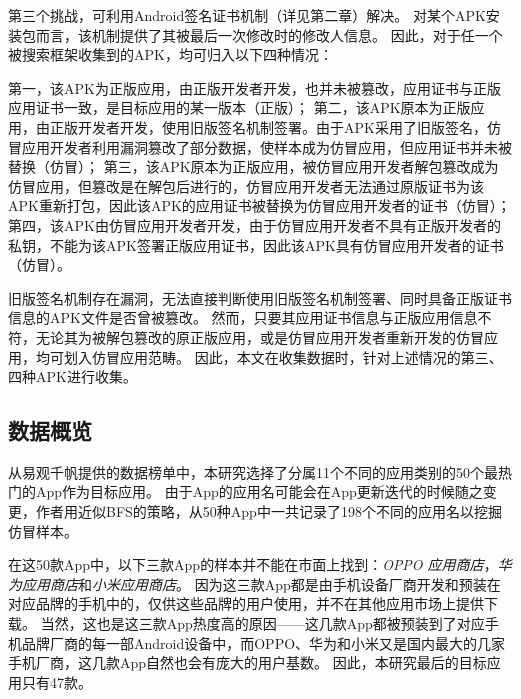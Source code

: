 第三个挑战，可利用Android签名证书机制（详见第二章）解决。
对某个APK安装包而言，该机制提供了其被最后一次修改时的修改人信息。
因此，对于任一个被搜索框架收集到的APK，均可归入以下四种情况：

第一，该APK为正版应用，由正版开发者开发，也并未被篡改，应用证书与正版应用证书一致，是目标应用的某一版本（正版）；
第二，该APK原本为正版应用，由正版开发者开发，使用旧版签名机制签署。由于APK采用了旧版签名，仿冒应用开发者利用漏洞篡改了部分数据，使样本成为仿冒应用，但应用证书并未被替换（仿冒）；
第三，该APK原本为正版应用，被仿冒应用开发者解包篡改成为仿冒应用，但篡改是在解包后进行的，仿冒应用开发者无法通过原版证书为该APK重新打包，因此该APK的应用证书被替换为仿冒应用开发者的证书（仿冒）；
第四，该APK由仿冒应用开发者开发，由于仿冒应用开发者不具有正版开发者的私钥，不能为该APK签署正版应用证书，因此该APK具有仿冒应用开发者的证书（仿冒）。

旧版签名机制存在漏洞，无法直接判断使用旧版签名机制签署、同时具备正版证书信息的APK文件是否曾被篡改。
然而，只要其应用证书信息与正版应用信息不符，无论其为被解包篡改的原正版应用，或是仿冒应用开发者重新开发的仿冒应用，均可划入仿冒应用范畴。
因此，本文在收集数据时，针对上述情况的第三、四种APK进行收集。


\subsection{数据概览}
\label{sec:data_overview}


从易观千帆提供的数据榜单中，本研究选择了分属11个不同的应用类别的50个最热门的App作为目标应用。
由于App的应用名可能会在App更新迭代的时候随之变更，作者用近似BFS的策略，从50种App中一共记录了198个不同的应用名以挖掘仿冒样本。

在这50款App中，以下三款App的样本并不能在市面上找到：\emph{OPPO 应用商店}，\emph{华为应用商店}和\emph{小米应用商店}。
因为这三款App都是由手机设备厂商开发和预装在对应品牌的手机中的，仅供这些品牌的用户使用，并不在其他应用市场上提供下载。
当然，这也是这三款App热度高的原因——这几款App都被预装到了对应手机品牌厂商的每一部Android设备中，而OPPO、华为和小米又是国内最大的几家手机厂商，这几款App自然也会有庞大的用户基数。
因此，本研究最后的目标应用只有47款。

